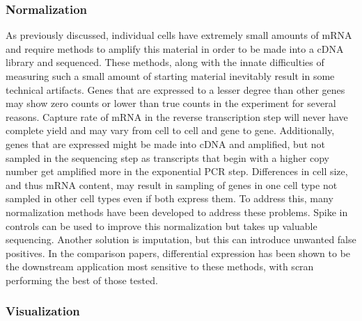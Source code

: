 \subsubsection{Normalization}\label{section:normalize}

\par{
As previously discussed, individual cells have extremely small amounts of mRNA and require methods to amplify this material in order to be made into a cDNA library and sequenced. These methods, along with the innate difficulties of measuring such a small amount of starting material inevitably result in some technical artifacts. Genes that are expressed to a lesser degree than other genes may show zero counts or lower than true counts in the experiment for several reasons\cite{technoise}. Capture rate of mRNA in the reverse transcription step will never have complete yield and may vary from cell to cell and gene to gene. Additionally, genes that are expressed might be made into cDNA and amplified, but not sampled in the sequencing step as transcripts that begin with a higher copy number get amplified more in the exponential PCR step. Differences in cell size, and thus mRNA content, may result in sampling of genes in one cell type not sampled in other cell types even if both express them. To address this, many normalization methods have been developed\cite{normalize1}\cite{normalize2} to address these problems. Spike in controls can be used to improve this normalization\cite{marioni1} but takes up valuable sequencing. Another solution is imputation\cite{imputesc}, but this can introduce unwanted false positives\cite{fpimpute}. In the comparison papers, differential expression has been shown to be the downstream application most sensitive to these methods\cite{normalsc}, with scran\cite{scran} performing the best of those tested.
}

\subsubsection{Visualization}

